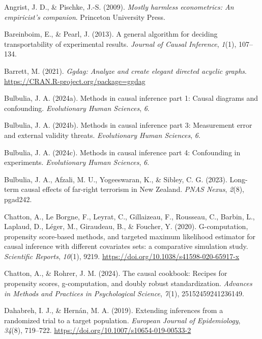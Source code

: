 \documentclass[
  single column]{article}
\newlength{\cslhangindent}
\newenvironment{CSLReferences}[2] %
 {\begin{list}{}{%
  \setlength{\itemindent}{0pt}
  \setlength{\leftmargin}{0pt}
  \setlength{\parsep}{0pt}
  \ifodd #1
   \setlength{\leftmargin}{\cslhangindent}
   \setlength{\itemindent}{-1\cslhangindent}
  \fi
  \setlength{\itemsep}{#2\baselineskip}}}
 {\end{list}}
\begin{document}
\label{refs}
\begin{CSLReferences}{1}{0}
Angrist, J. D., \& Pischke, J.-S. (2009). \emph{Mostly harmless
econometrics: An empiricist's companion}. Princeton University Press.

Bareinboim, E., \& Pearl, J. (2013). A general algorithm for deciding
transportability of experimental results. \emph{Journal of Causal
Inference}, \emph{1}(1), 107--134.

Barrett, M. (2021). \emph{Ggdag: Analyze and create elegant directed
acyclic graphs}. \url{https://CRAN.R-project.org/package=ggdag}

Bulbulia, J. A. (2024a). Methods in causal inference part 1: Causal
diagrams and confounding. \emph{Evolutionary Human Sciences}, \emph{6}.

Bulbulia, J. A. (2024b). Methods in causal inference part 3: Measurement
error and external validity threats. \emph{Evolutionary Human Sciences},
\emph{6}.

Bulbulia, J. A. (2024c). Methods in causal inference part 4: Confounding
in experiments. \emph{Evolutionary Human Sciences}, \emph{6}.

Bulbulia, J. A., Afzali, M. U., Yogeeswaran, K., \& Sibley, C. G.
(2023). Long-term causal effects of far-right terrorism in {N}ew
{Z}ealand. \emph{PNAS Nexus}, \emph{2}(8), pgad242.

Chatton, A., Le Borgne, F., Leyrat, C., Gillaizeau, F., Rousseau, C.,
Barbin, L., Laplaud, D., Léger, M., Giraudeau, B., \& Foucher, Y.
(2020). G-computation, propensity score-based methods, and targeted
maximum likelihood estimator for causal inference with different
covariates sets: a comparative simulation study. \emph{Scientific
Reports}, \emph{10}(1), 9219.
\url{https://doi.org/10.1038/s41598-020-65917-x}

Chatton, A., \& Rohrer, J. M. (2024). The causal cookbook: Recipes for
propensity scores, g-computation, and doubly robust standardization.
\emph{Advances in Methods and Practices in Psychological Science},
\emph{7}(1), 25152459241236149.

Dahabreh, I. J., \& Hernán, M. A. (2019). Extending inferences from a
randomized trial to a target population. \emph{European Journal of
Epidemiology}, \emph{34}(8), 719--722.
\url{https://doi.org/10.1007/s10654-019-00533-2}


\end{CSLReferences}
\end{document}
